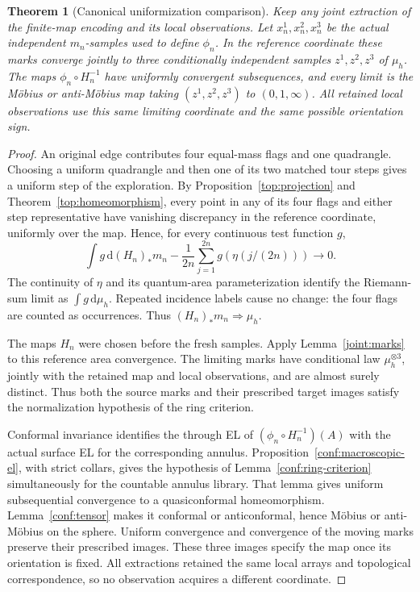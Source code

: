 \documentclass[11pt]{article}
\numberwithin{equation}{section}
\newtheorem{theorem}{Theorem}[section]
\theoremstyle{definition}
\theoremstyle{remark}
\newcommand{\dd}{\mathrm d}
\newcommand{\1}{\mathbf 1}
\begin{document}
\begin{theorem}[Canonical uniformization comparison]
\label{conf:canonical}
Keep any joint extraction of the finite-map encoding and its local
observations.  Let \(x_n^1,x_n^2,x_n^3\) be the actual independent
\(m_n\)-samples used to define \(\phi_n\).  In the reference
coordinate these marks converge jointly to three conditionally
independent samples \(z^1,z^2,z^3\) of \(\mu_h\).  The maps
\(\phi_n\circ H_n^{-1}\) have uniformly convergent subsequences,
and every limit is the M\"obius or anti-M\"obius map taking
\((z^1,z^2,z^3)\) to \((0,1,\infty)\).  All retained local
observations use this same limiting coordinate and the same possible
orientation sign.
\end{theorem}

\begin{proof}
An original edge contributes four equal-mass flags and one
quadrangle.  Choosing a uniform quadrangle and then one of its
two matched tour steps gives a uniform step of the exploration.
By Proposition~\ref{top:projection} and Theorem~\ref{top:homeomorphism},
every point in any of its four
flags and either step representative have vanishing discrepancy
in the reference coordinate, uniformly over the map.  Hence, for
every continuous test function \(g\),
\[
 \int g\,\dd (H_n)_*m_n
       -\frac1{2n}\sum_{j=1}^{2n}g(\eta(j/(2n)))
       \longrightarrow0.
\]
The continuity of \(\eta\) and its quantum-area parameterization
identify the Riemann-sum limit as \(\int g\,\dd\mu_h\).
Repeated incidence labels cause no change: the four flags are
counted as occurrences.  Thus \((H_n)_*m_n\Rightarrow\mu_h\).

The maps \(H_n\) were chosen before the fresh samples.  Apply
Lemma~\ref{joint:marks} to this reference area convergence.  The
limiting marks have conditional law \(\mu_h^{\otimes3}\), jointly
with the retained map and local observations, and are almost surely
distinct.  Thus both the source marks and their prescribed target
images satisfy the normalization hypothesis of the ring criterion.

Conformal invariance identifies the through EL of
\((\phi_n\circ H_n^{-1})(A)\) with the actual surface EL for
the corresponding annulus.  Proposition~\ref{conf:macroscopic-el},
with strict collars, gives the hypothesis of
Lemma~\ref{conf:ring-criterion} simultaneously for the countable
annulus library.  That lemma gives uniform subsequential
convergence to a quasiconformal homeomorphism.  Lemma~\ref{conf:tensor}
makes it conformal or anticonformal, hence M\"obius or
anti-M\"obius on the sphere.  Uniform convergence and convergence
of the moving marks preserve their prescribed images.  These
three images specify the map once its orientation is fixed.
All extractions retained the same local arrays and topological
correspondence, so no observation acquires a different coordinate.
\end{proof}
\end{document}
